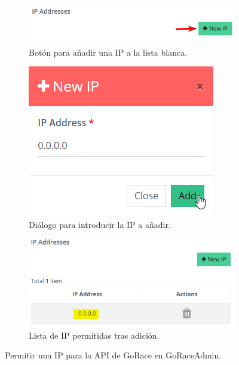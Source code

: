 \begin{figure}
    \begin{subfigure}{0.32\textwidth}
        \includegraphics[width=\linewidth]{images/go-admin-add-ip-btn.png}
        \caption{Botón para añadir una IP a la lista blanca.}
        \label{fig:go-admin-add-ip-btn}
    \end{subfigure}
    \hspace*{\fill}
    \begin{subfigure}{0.32\textwidth}
        \includegraphics[width=\linewidth]{images/go-admin-add-ip-dialog.png}
        \caption{Diálogo para introducir la IP a añadir.}
        \label{fig:go-admin-add-ip-dialog}
    \end{subfigure}
    \hspace*{\fill}
    \begin{subfigure}{0.32\textwidth}
        \includegraphics[width=\linewidth]{images/go-admin-add-ip-success.png}
        \caption{Lista de IP permitidas tras adición.}
        \label{fig:go-admin-add-ip-success}
    \end{subfigure}
    \caption{Permitir una IP para la API de GoRace en GoRaceAdmin.}
\end{figure}

